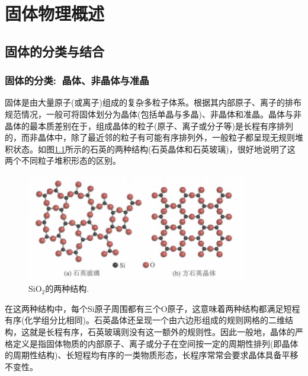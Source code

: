 \setcounter{chapter}{7}
\chapter{固体物理概述}\label{chap:Solid-state_introduct}
\section{固体的分类与结合}
\subsection{固体的分类:~晶体、非晶体与准晶}
固体是由大量原子(或离子)组成的复杂多粒子体系。根据其内部原子、离子的排布规范情况，一般可将固体划分为晶体(包括单晶与多晶)、非晶体和准晶。晶体与非晶体的最本质差别在于，组成晶体的粒子(原子、离子或分子等)是长程有序排列的，而非晶体中，除了最近邻的粒子有可能有序排列外，一般粒子都呈现无规则堆积状态。如图\ref{Fig:SSI-01}所示的石英的两种结构(石英晶体和石英玻璃)，很好地说明了这两个不同粒子堆积形态的区别。
\begin{figure}[h!]
\centering
\vspace*{-0.18in}
\includegraphics[height=1.85in,width=3.8in,viewport=0 0 84 40,clip]{Figures/2D-SiO2.png}
\caption{\small \textrm{$\mathrm{SiO}_2$的两种结构.}}%
\label{Fig:SSI-01}
\end{figure}
在这两种结构中，每个Si原子周围都有三个O原子，这意味着两种结构都满足短程有序(化学组分比相同)。石英晶体还呈现一个由六边形组成的规则网格的二维结构，这就是长程有序，石英玻璃则没有这一额外的规则性。因此一般地，{晶体的严格定义是指固体物质的内部原子、离子或分子在空间按一定的周期性排列(即晶体的周期性结构)、长短程均有序的一类物质形态，长程序常常会要求晶体具备平移不变性。}

